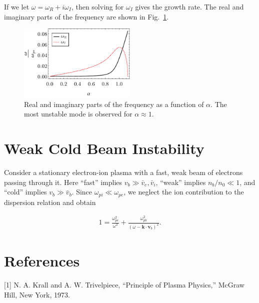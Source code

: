 \documentclass[12pt]{article}
\newcommand{\mb}{\mathbf}
\begin{document}


If we let $\omega = \omega_R+i \omega_I$, then solving for $\omega_I$ gives the growth rate. The real and imaginary parts of the frequency are shown in Fig.~\ref{fig:omega_roots}.

\begin{figure}
	\centering
	\includegraphics[width=0.5\textwidth]{omega_roots}
	\caption{\label{fig:omega_roots} Real and imaginary parts of the frequency as a function of $\alpha$. The most unstable mode is observed for $\alpha \approx 1$.}
\end{figure}

\section*{Weak Cold Beam Instability}
Consider a stationary electron-ion plasma with a fast, weak beam of electrons passing through it. Here ``fast'' implies $v_b \gg \bar{v}_e, \bar{v}_i$, ``weak'' implies $n_b/n_0 \ll 1$, and ``cold'' implies $v_b \gg \bar{v}_b$. Since $\omega_{pi} \ll \omega_{pe}$, we neglect the ion contribution to the dispersion relation and obtain

\begin{align*}
1 = \frac{\omega_{pe}^2}{\omega^2} + \frac{\omega_{pb}^2}{(\omega-\mb{k} \cdot \mb{v}_b)^2}.
\end{align*}

\section*{References}
[1] N. A. Krall and A. W. Trivelpiece, ``Principle of Plasma Physics,'' McGraw Hill, New York, 1973.
\end{document}
